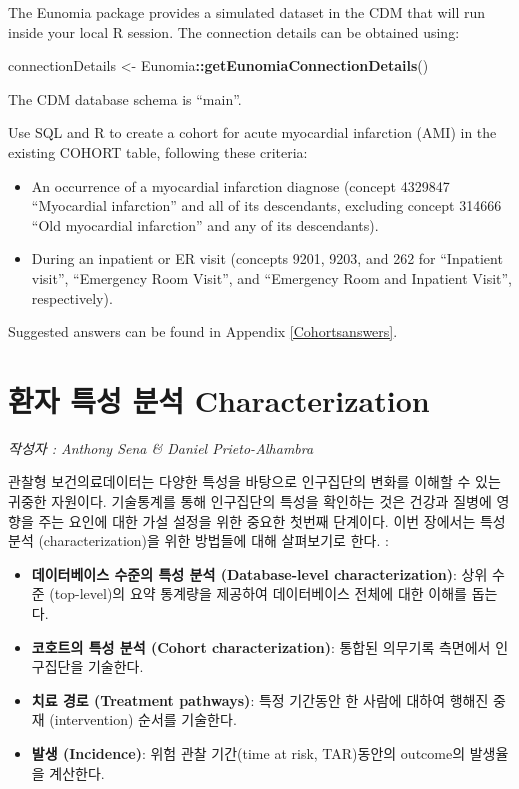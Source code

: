 \documentclass[11pt]{book}
\newenvironment{Shaded}{\begin{snugshade}}{\end{snugshade}}
\newcommand{\KeywordTok}[1]{\textcolor[rgb]{0.13,0.29,0.53}{\textbf{#1}}}
\newcommand{\StringTok}[1]{\textcolor[rgb]{0.31,0.60,0.02}{#1}}
\newcommand{\OperatorTok}[1]{\textcolor[rgb]{0.81,0.36,0.00}{\textbf{#1}}}
\newcommand{\NormalTok}[1]{#1}
\providecommand{\tightlist}{%
  \setlength{\itemsep}{0pt}\setlength{\parskip}{0pt}}
\theoremstyle{definition}
\theoremstyle{definition}
\theoremstyle{definition}
\theoremstyle{remark}
\let\BeginKnitrBlock\begin \let\EndKnitrBlock\end
\begin{document}
The Eunomia package provides a simulated dataset in the CDM that will
run inside your local R session. The connection details can be obtained
using:

\begin{Shaded}
\begin{Highlighting}[]
\NormalTok{connectionDetails <-}\StringTok{ }\NormalTok{Eunomia}\OperatorTok{::}\KeywordTok{getEunomiaConnectionDetails}\NormalTok{()}
\end{Highlighting}
\end{Shaded}

The CDM database schema is ``main''.

\BeginKnitrBlock{exercise}
\protect\hypertarget{exr:exerciseCohortsSql}{}{\label{exr:exerciseCohortsSql}
}Use SQL and R to create a cohort for acute myocardial infarction (AMI)
in the existing COHORT table, following these criteria:

\begin{itemize}
\tightlist
\item
  An occurrence of a myocardial infarction diagnose (concept 4329847
  ``Myocardial infarction'' and all of its descendants, excluding
  concept 314666 ``Old myocardial infarction'' and any of its
  descendants).
\item
  During an inpatient or ER visit (concepts 9201, 9203, and 262 for
  ``Inpatient visit'', ``Emergency Room Visit'', and ``Emergency Room
  and Inpatient Visit'', respectively).
\end{itemize}
\EndKnitrBlock{exercise}

Suggested answers can be found in Appendix \ref{Cohortsanswers}.

\chapter{환자 특성 분석 Characterization}\label{Characterization}

\emph{작성자 : Anthony Sena \& Daniel Prieto-Alhambra}

관찰형 보건의료데이터는 다양한 특성을 바탕으로 인구집단의 변화를 이해할
수 있는 귀중한 자원이다. 기술통계를 통해 인구집단의 특성을 확인하는 것은
건강과 질병에 영향을 주는 요인에 대한 가설 설정을 위한 중요한 첫번째
단계이다. 이번 장에서는 특성 분석 (characterization)을 위한 방법들에
대해 살펴보기로 한다. :

\begin{itemize}
\tightlist
\item
  \textbf{데이터베이스 수준의 특성 분석 (Database-level
  characterization)}: 상위 수준 (top-level)의 요약 통계량을 제공하여
  데이터베이스 전체에 대한 이해를 돕는다.
\item
  \textbf{코호트의 특성 분석 (Cohort characterization)}: 통합된 의무기록
  측면에서 인구집단을 기술한다.
\item
  \textbf{치료 경로 (Treatment pathways)}: 특정 기간동안 한 사람에
  대하여 행해진 중재 (intervention) 순서를 기술한다.
\item
  \textbf{발생 (Incidence)}: 위험 관찰 기간(time at risk, TAR)동안의
  outcome의 발생율을 계산한다.
\end{itemize}
\end{document}
